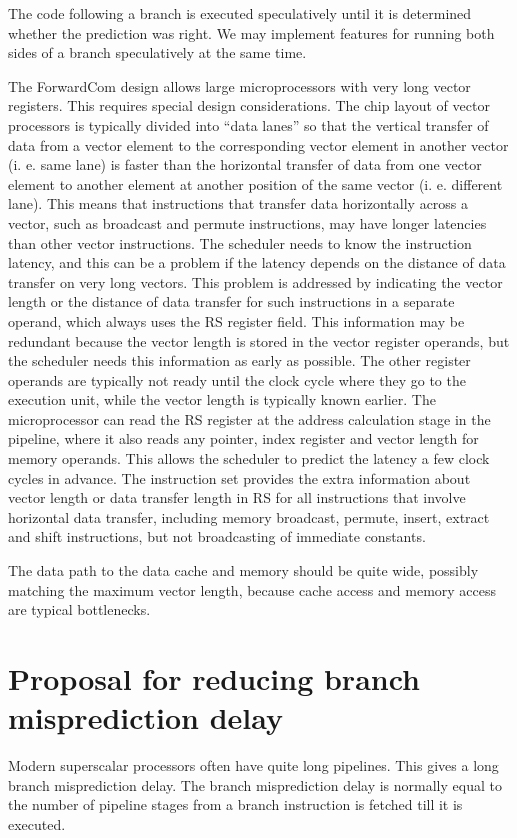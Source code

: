 \documentclass[forwardcom.tex]{subfiles}
\begin{document}
The code following a branch is executed speculatively until it is determined whether the prediction was right. We may implement features for running both sides of a branch speculatively at the same time. 
\vspace{2mm}

The ForwardCom design allows large microprocessors with very long vector registers. This requires special design considerations. The chip layout of vector processors is typically divided into ``data lanes'' so that the vertical transfer of data from a vector element to the corresponding 
vector element in another vector (i. e. same lane) is faster than the horizontal transfer of data from one vector element to another element at another position of the same vector (i. e. different lane). This means that instructions that transfer data horizontally across a vector, such as broadcast and permute instructions, may have longer latencies than other vector instructions. The scheduler needs to know the instruction latency, and this can be a problem if the latency depends on the distance of data transfer on very long vectors. This problem is addressed by indicating the vector length or the distance of data transfer for such instructions in a separate operand, which always uses the RS register field. This information may be redundant because the vector length is stored in the vector register operands, but the scheduler needs this information as early as possible. The other register operands are typically not ready until the clock cycle where they go to the execution unit, while the vector length is typically known earlier. The microprocessor can read the RS register at the address calculation stage in the pipeline, where it also reads any pointer, index register and vector length for memory operands. This allows the scheduler to predict the latency a few clock cycles in advance. The instruction set provides the extra information about vector length or data transfer length in RS for all instructions that involve horizontal data transfer, including memory broadcast, permute, insert, extract and shift instructions, but not broadcasting of immediate constants. 
\vspace{2mm}

The data path to the data cache and memory should be quite wide, possibly matching the maximum vector length, because cache access and memory access are typical bottlenecks.


\section{Proposal for reducing branch misprediction delay}
Modern superscalar processors often have quite long pipelines. This gives a long branch misprediction delay. The branch misprediction delay is normally equal to the number of pipeline stages from a branch instruction is fetched till it is executed.
\vspace{2mm}
\end{document}
